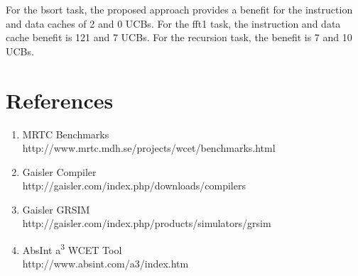 \documentclass[12pt]{article}
\begin{document}
For the bsort task, the proposed approach provides a benefit for the
instruction and data caches of 2 and 0 UCBs. For the fft1 task, the
instruction and data cache benefit is 121 and 7 UCBs. For the
recursion task, the benefit is 7 and 10 UCBs.

\section{References}

\begin{enumerate}
\item MRTC Benchmarks \\
http://www.mrtc.mdh.se/projects/wcet/benchmarks.html

\item Gaisler Compiler  \\
http://gaisler.com/index.php/downloads/compilers

\item Gaisler GRSIM \\
http://gaisler.com/index.php/products/simulators/grsim

\item AbsInt a\textsuperscript{3} WCET Tool \\
http://www.absint.com/a3/index.htm
\end{enumerate}
\end{document}
